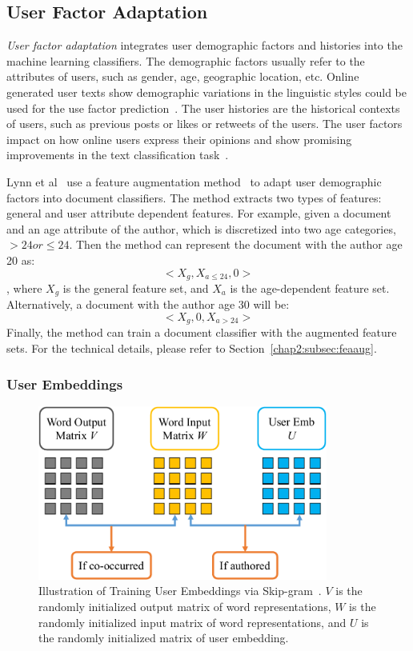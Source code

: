 \subsection{User Factor Adaptation}

\textit{User factor adaptation} integrates user demographic factors and histories into the machine learning classifiers. The demographic factors usually refer to the attributes of users, such as gender, age, geographic location, etc. Online generated user texts show demographic variations in the linguistic styles could be used for the use factor prediction~\cite{rosenthal2011age, zhang2016predicting, hovy2018improving}. The user histories are the historical contexts of users, such as previous posts or likes or retweets of the users. The user factors impact on how online users express their opinions and show promising improvements in the text classification task~\cite{volkova2013exploring, hovy2015demographic, lynn2017human, yang2017overcoming}.

Lynn et al~\cite{lynn2017human} use a feature augmentation method~\cite{daume2007frustratingly} to adapt user demographic factors into document classifiers.
The method extracts two types of features: general and user attribute dependent features. 
For example, given a document and an age attribute of the author, which is discretized into two age categories, $>24 or \leq 24$.
Then the method can represent the document with the author age 20 as:
$$<X_g, X_{a\leq24}, 0>$$
, where $X_g$ is the general feature set, and $X_a$ is the age-dependent feature set.
Alternatively, a document with the author age 30 will be:
$$<X_g, 0, X_{a>24}>$$
Finally, the method can train a document classifier with the augmented feature sets.
For the technical details, please refer to Section~\ref{chap2:subsec:feaaug}.


\subsubsection{User Embeddings}

\begin{figure}[tb!]
\centering
\includegraphics[width=0.85\textwidth]{images/chapter2/user-emb.pdf}
\caption{Illustration of Training User Embeddings via Skip-gram~\cite{amir2017quantifying}. $V$ is the randomly initialized output matrix of word representations, $W$ is the randomly initialized input matrix of word representations, and $U$ is the randomly initialized matrix of user embedding.}
\label{chap2:fig:user}
\end{figure}

